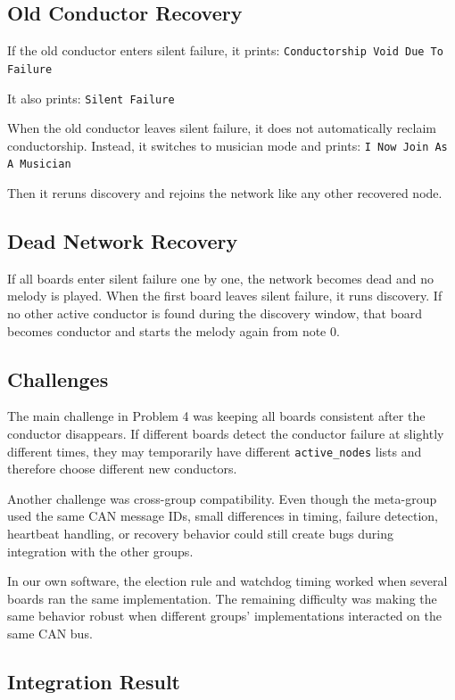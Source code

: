 \documentclass[11pt,a4paper]{article}
\begin{document}
\subsection*{Old Conductor Recovery}

If the old conductor enters silent failure, it prints: \texttt{Conductorship Void Due To Failure}

It also prints: \texttt{Silent Failure}

When the old conductor leaves silent failure, it does not automatically reclaim conductorship. Instead, it switches to musician mode and prints: \texttt{I Now Join As A Musician}

Then it reruns discovery and rejoins the network like any other recovered node.

\subsection*{Dead Network Recovery}

If all boards enter silent failure one by one, the network becomes dead and no melody is played. When the first board leaves silent failure, it runs discovery. If no other active conductor is found during the discovery window, that board becomes conductor and starts the melody again from note 0.

\subsection*{Challenges}

The main challenge in Problem 4 was keeping all boards consistent after the conductor disappears. If different boards detect the conductor failure at slightly different times, they may temporarily have different \texttt{active\_\allowbreak{}nodes} lists and therefore choose different new conductors.

Another challenge was cross-group compatibility. Even though the meta-group used the same CAN message IDs, small differences in timing, failure detection, heartbeat handling, or recovery behavior could still create bugs during integration with the other groups.

In our own software, the election rule and watchdog timing worked when several boards ran the same implementation. The remaining difficulty was making the same behavior robust when different groups' implementations interacted on the same CAN bus.

\subsection*{Integration Result}
\end{document}
